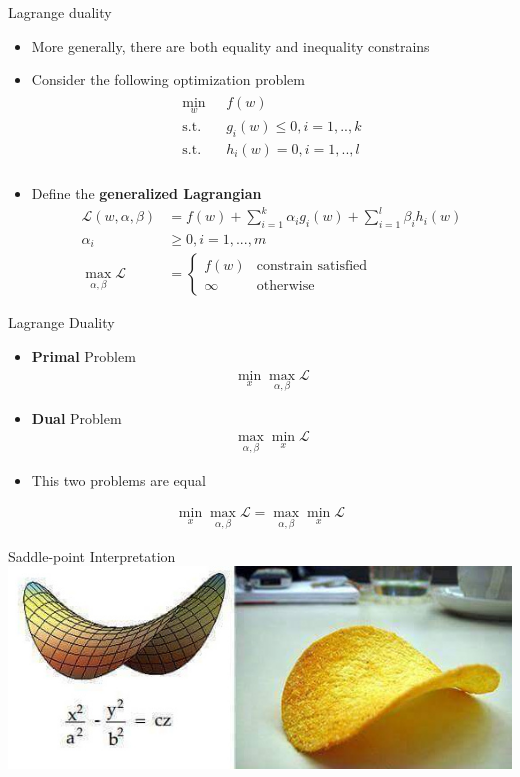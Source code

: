 \documentclass{beamer}
\begin{document}
\begin{frame}{Lagrange duality}
\begin{itemize}
\item More generally, there are both equality and inequality constrains
\item Consider the following optimization problem
\begin{align*}
\begin{split}
\min_w\text{ }&f(w) \\
\text{s.t. } &g_i(w) \leq 0, i=1,..,k\\
\text{s.t. } &h_i(w) = 0, i=1,..,l\\
\end{split}
\end{align*}
\item Define the \textbf{generalized Lagrangian}
\begin{align*}
\mathcal{L}(w, \alpha, \beta) &= f(w) + \sum_{i=1}^k\alpha_ig_i(w) + \sum_{i=1}^l\beta_ih_i(w) \\
\alpha_i&\geq0,i=1,...,m \\
\max_{\alpha, \beta} \mathcal{L} &= \begin{cases}
f(w) & \text{constrain satisfied}\\
\infty & \text{otherwise}
\end{cases}
\end{align*}
\end{itemize}
\end{frame}

\begin{frame}{Lagrange Duality}
\begin{itemize}
\item \textbf{Primal} Problem 
\begin{align*}
	\min_x\max_{\alpha, \beta} \mathcal{L}
\end{align*}
\item \textbf{Dual} Problem 
\begin{align*}
	\max_{\alpha, \beta}\min_x \mathcal{L}
\end{align*}
\item This two problems are equal
\end{itemize}
\begin{align}
\min_x\max_{\alpha, \beta} \mathcal{L} = \max_{\alpha, \beta}\min_x \mathcal{L}
\end{align}
\end{frame}


\begin{frame}{Saddle-point Interpretation}
\includegraphics[width=\textwidth]{images/saddle.png}
\end{frame}
\end{document}
